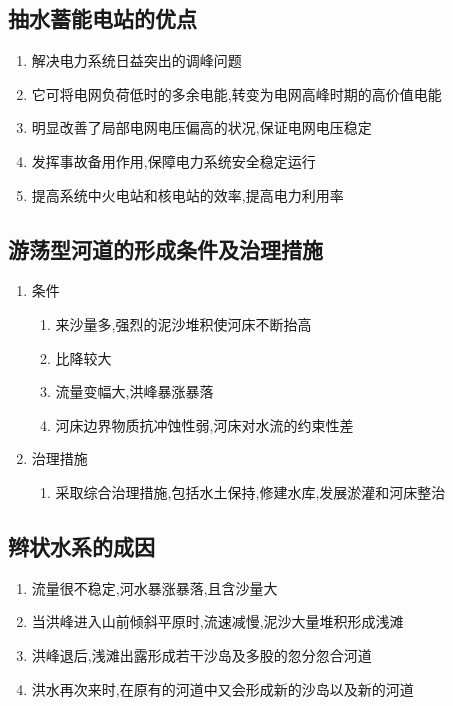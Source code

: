 \documentclass[a4paper]{article}
\begin{document}
    \subsection{抽水蓄能电站的优点}
    \begin{enumerate}
        \item 解决电力系统日益突出的调峰问题
        \item 它可将电网负荷低时的多余电能,转变为电网高峰时期的高价值电能
        \item 明显改善了局部电网电压偏高的状况,保证电网电压稳定
        \item 发挥事故备用作用,保障电力系统安全稳定运行
        \item 提高系统中火电站和核电站的效率,提高电力利用率
    \end{enumerate}
    \subsection{游荡型河道的形成条件及治理措施}
    \begin{enumerate}
        \item 条件
        \begin{enumerate}
            \item 来沙量多,强烈的泥沙堆积使河床不断抬高
            \item 比降较大
            \item 流量变幅大,洪峰暴涨暴落
            \item 河床边界物质抗冲蚀性弱,河床对水流的约束性差
        \end{enumerate}
        \item 治理措施
        \begin{enumerate}
            \item 采取综合治理措施,包括水土保持,修建水库,发展淤灌和河床整治
        \end{enumerate}
    \end{enumerate}
    \subsection{辫状水系的成因}
    \begin{enumerate}
        \item 流量很不稳定,河水暴涨暴落,且含沙量大
        \item 当洪峰进入山前倾斜平原时,流速减慢,泥沙大量堆积形成浅滩
        \item 洪峰退后,浅滩出露形成若干沙岛及多股的忽分忽合河道
        \item 洪水再次来时,在原有的河道中又会形成新的沙岛以及新的河道
    \end{enumerate}
\end{document}
